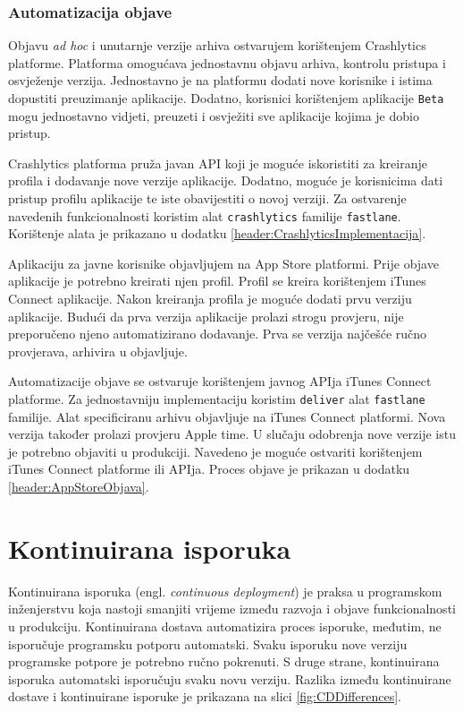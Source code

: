 \documentclass[times, utf8, diplomski, numeric]{fer}
\newcommand{\eng}[1]{(engl. \textit{#1})}
\begin{document}
\subsection{Automatizacija objave}

Objavu \textit{ad hoc} i unutarnje verzije arhiva ostvarujem korištenjem Crashlytics platforme. Platforma omogućava jednostavnu objavu arhiva, kontrolu pristupa i osvježenje verzija. Jednostavno je na platformu dodati nove korisnike i istima dopustiti preuzimanje aplikacije. Dodatno, korisnici korištenjem aplikacije \verb|Beta| mogu jednostavno vidjeti, preuzeti i osvježiti sve aplikacije kojima je dobio pristup.

Crashlytics platforma pruža javan API koji je moguće iskoristiti za kreiranje profila i dodavanje nove verzije aplikacije. Dodatno, moguće je korisnicima dati pristup profilu aplikacije te iste obavijestiti o novoj verziji. Za ostvarenje navedenih funkcionalnosti koristim alat \verb|crashlytics| familije \verb|fastlane|. Korištenje alata je prikazano u dodatku \ref{header:CrashlyticsImplementacija}.

Aplikaciju za javne korisnike objavljujem na App Store platformi. Prije objave aplikacije je potrebno kreirati njen profil. Profil se kreira korištenjem iTunes Connect aplikacije. Nakon kreiranja profila je moguće dodati prvu verziju aplikacije. Budući da prva verzija aplikacije prolazi strogu provjeru, nije preporučeno njeno automatizirano dodavanje. Prva se verzija najčešće ručno provjerava, arhivira u objavljuje.

Automatizacije objave se ostvaruje korištenjem javnog APIja iTunes Connect platforme. Za jednostavniju implementaciju koristim \verb|deliver| alat \verb|fastlane| familije. Alat specificiranu arhivu objavljuje na iTunes Connect platformi. Nova verzija također prolazi provjeru Apple time. U slučaju odobrenja nove verzije istu je potrebno objaviti u produkciji. Navedeno je moguće ostvariti korištenjem iTunes Connect platforme ili APIja. Proces objave je prikazan u dodatku \ref{header:AppStoreObjava}.



\chapter{Kontinuirana isporuka} \label{header:KontinuiranaIsporuka}

Kontinuirana isporuka \eng{continuous deployment} je praksa u programskom inženjerstvu koja nastoji smanjiti vrijeme između razvoja i objave funkcionalnosti u produkciju. Kontinuirana dostava automatizira proces isporuke, međutim, ne isporučuje programsku potporu automatski. Svaku isporuku nove verziju programske potpore je potrebno ručno pokrenuti. S druge strane, kontinuirana isporuka automatski isporučuju svaku novu verziju. Razlika između kontinuirane dostave i kontinuirane isporuke je prikazana na slici \ref{fig:CDDifferences}\citep{cd:whats_the_diff}.
\end{document}
